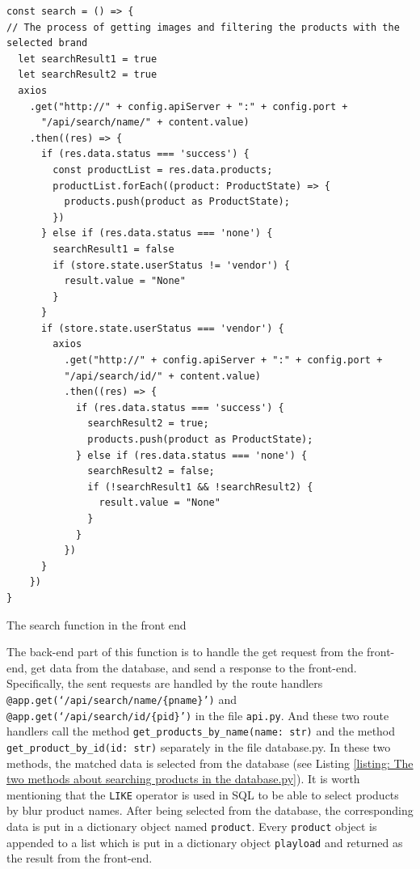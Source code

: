 \documentclass{article}
\begin{document}
\begin{listing}[!htp]
\begin{verbatim}
const search = () => {
// The process of getting images and filtering the products with the selected brand
  let searchResult1 = true
  let searchResult2 = true
  axios
    .get("http://" + config.apiServer + ":" + config.port +
      "/api/search/name/" + content.value)
    .then((res) => {
      if (res.data.status === 'success') {
        const productList = res.data.products;
        productList.forEach((product: ProductState) => {
          products.push(product as ProductState);
        })
      } else if (res.data.status === 'none') {
        searchResult1 = false
        if (store.state.userStatus != 'vendor') {
          result.value = "None"
        }
      }
      if (store.state.userStatus === 'vendor') {
        axios
          .get("http://" + config.apiServer + ":" + config.port +
          "/api/search/id/" + content.value)
          .then((res) => {
            if (res.data.status === 'success') {
              searchResult2 = true;
              products.push(product as ProductState);
            } else if (res.data.status === 'none') {
              searchResult2 = false;
              if (!searchResult1 && !searchResult2) {
                result.value = "None"
              }
            }
          })
      }
    })
}
\end{verbatim}
\caption{The search function in the front end}
\label{listing: The search function in the front end}
\end{listing}The back-end part of this function is to handle the get request from the front-end, get data from the database, and send a response to the front-end. Specifically, the sent requests are handled by the route handlers \verb|@app.get(‘/api/search/name/{pname}’)| and \verb|@app.get(‘/api/search/id/{pid}’)| in the file \verb|api.py|. And these two route handlers call the method \verb|get_products_by_name(name: str)| and the method \verb|get_product_by_id(id: str)| separately in the file database.py. In these two methods, the matched data is selected from the database (see Listing \ref{listing: The two methods about searching products in the database.py}). It is worth mentioning that the \verb|LIKE| operator is used in SQL to be able to select products by blur product names. After being selected from the database, the corresponding data is put in a dictionary object named \verb|product|. Every \verb|product| object is appended to a list which is put in a dictionary object \verb|playload| and returned as the result from the front-end. 
\end{document}
